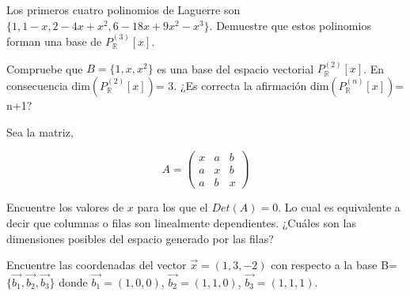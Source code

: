 \begin{exercise}
\item

Los primeros cuatro polinomios de Laguerre son  $\{1, 1-x, 2-4x+x^2, 6-18x + 9x^2 - x^3\}$. Demuestre que estos polinomios forman una base de $P^{(3)}_{\mathbb{R}}[x]$.
\end{exercise}

\begin{exercise}
\item

Compruebe que $B=\{1,x,x^2\}$ es una base del espacio vectorial $P^{(2)}_{\mathbb{R}}[x]$. En consecuencia dim$(P^{(2)}_{\mathbb{R}}[x])$= 3.
¿Es correcta la afirmación dim$(P^{(n)}_{\mathbb{R}}[x])$= n+1?
 \end{exercise}
\begin{exercise}
\item

Sea la matriz, 


$$A=\left(\begin{array}{ccc}x & a & b \\ a & x & b\\ a & b & x 
\end{array}
 \right)$$

 \bigskip
\noindent 
Encuentre los valores de $x$ para los que el $Det (A)= 0$. Lo cual es equivalente a decir que columnas o filas son linealmente dependientes.
¿Cuáles son las dimensiones posibles del espacio generado por las filas?

\end{exercise}







 
\begin{exercise}
\item

Encuentre las coordenadas del vector  $\vec{x}=(1,3,-2)$ con respecto a la base B=$\{\vec{b_1}, \vec{b_2}, \vec{b_3}\}$
donde $\vec{b_1}=(1,0,0)$, $\vec{b_2}=(1,1,0)$, $\vec{b_3}=(1,1,1)$.

\bigskip

\end{exercise}

